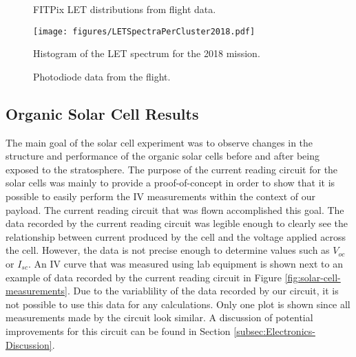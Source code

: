 \begin{figure}[h!]
\hfill
{}
\hfill
\caption{FITPix LET distributions from flight data.}
\label{fig:fitpix-let}
\end{figure}

\begin{figure}[h!]
	\begin{center}
	\texttt{[image: figures/LETSpectraPerCluster2018.pdf]}
	\caption{Histogram of the LET spectrum for the 2018 mission.}
	\label{fig:2018-minipix-let}
	\end{center}
\end{figure}

\begin{figure}[h!]
\hfill
{}
\hfill
{}
\hfill
{}
\hfill
\caption{Photodiode data from the flight.}
\label{fig:photodiodes}
\end{figure}


\subsection{Organic Solar Cell Results}
\label{sec:Solar-Cell-Results}

The main goal of the solar cell experiment was to observe changes in the structure and performance of the organic solar cells before and after being exposed to the stratosphere.
The purpose of the current reading circuit for the solar cells was mainly to provide a proof-of-concept in order to show that it is possible to easily perform the IV measurements within the context of our payload.
The current reading circuit that was flown accomplished this goal.
The data recorded by the current reading circuit was legible enough to clearly see the relationship between current produced by the cell and the voltage applied across the cell.
However, the data is not precise enough to determine values such as $V_{oc}$ or $I_{sc}$.
An IV curve that was measured using lab equipment is shown next to an example of data recorded by the current reading circuit in Figure \ref{fig:solar-cell-measurements}. 
Due to the variablility of the data recorded by our circuit, it is not possible to use this data for any calculations.
Only one plot is shown since all measurements made by the circuit look similar.
A discussion of potential improvements for this circuit can be found in Section \ref{subsec:Electronics-Discussion}.

